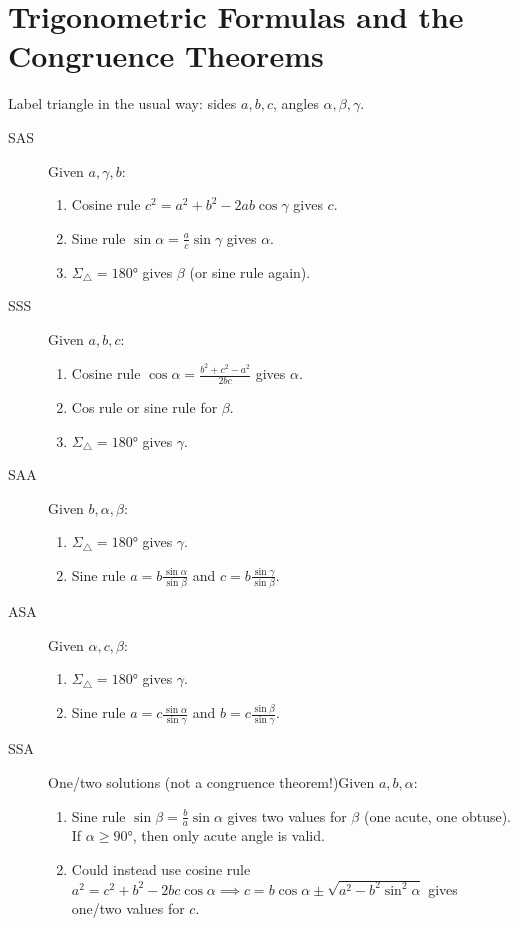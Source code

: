 \section*{Trigonometric Formulas and the Congruence Theorems}


Label triangle in the usual way: sides $a,b,c$, angles $\alpha,\beta,\gamma$.

\begin{description}
	\item[SAS] Given $a,\gamma,b$:
	\begin{enumerate}
	  \item Cosine rule $c^2=a^2+b^2-2ab\cos\gamma$ gives $c$.
	  \item Sine rule $\sin\alpha=\frac ac\sin\gamma$ gives $\alpha$.
	  \item $\Sigma_\triangle=\ang{180}$ gives $\beta$ (or sine rule again).
	\end{enumerate}
	
	\item[SSS] Given $a,b,c$:
	\begin{enumerate}
	  \item Cosine rule $\cos\alpha=\frac{b^2+c^2-a^2}{2bc}$ gives $\alpha$.
	  \item Cos rule or sine rule for $\beta$.
	  \item $\Sigma_\triangle=\ang{180}$ gives $\gamma$.
	\end{enumerate}
	
	\item[SAA] Given $b,\alpha,\beta$:
	\begin{enumerate}
	  \item $\Sigma_\triangle=\ang{180}$ gives $\gamma$.
	  \item Sine rule $a=b\frac{\sin\alpha}{\sin\beta}$ and $c=b\frac{\sin\gamma}{\sin\beta}$.
	\end{enumerate}
	
	\item[ASA] Given $\alpha,c,\beta$:
	\begin{enumerate}
	  \item $\Sigma_\triangle=\ang{180}$ gives $\gamma$.
	  \item Sine rule $a=c\frac{\sin\alpha}{\sin\gamma}$ and $b=c\frac{\sin\beta}{\sin\gamma}$.
	\end{enumerate}
	  
	\item[SSA] One/two solutions (not a congruence theorem!)\lstsp Given $a,b,\alpha$:
	\begin{enumerate}
	  \item Sine rule $\sin\beta=\frac ba\sin\alpha$ gives two values for $\beta$ (one acute, one obtuse). If $\alpha\ge\ang{90}$, then only acute angle is valid.
	  \item Could instead use cosine rule $a^2=c^2+b^2-2bc\cos\alpha\implies c=b\cos\alpha\pm\sqrt{a^2-b^2\sin^2\alpha}$ gives one/two values for $c$.
	\end{enumerate}
\end{description}


